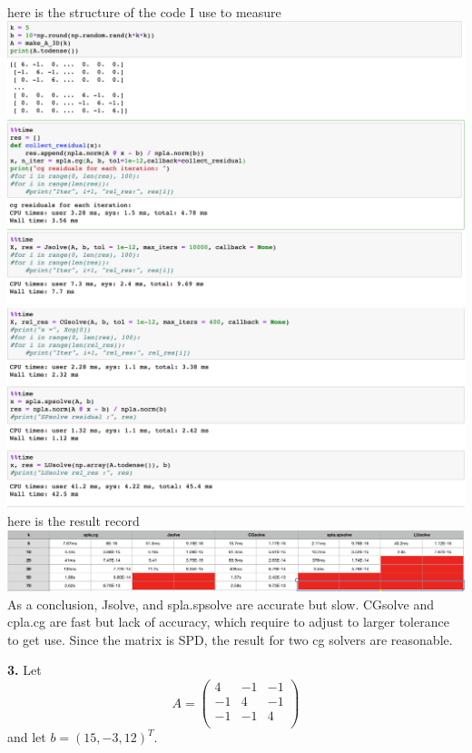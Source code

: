\documentclass[11pt]{article}
\begin{document}
\\here is the structure of the code I use to measure\\
\includegraphics[scale=0.4]{H421}\\
\includegraphics[scale=0.4]{H422.png}\\here is the result record\\
\includegraphics[scale=0.6]{H423.png}\\
As a conclusion, Jsolve, and spla.spsolve are accurate but slow. CGsolve and cpla.cg are fast but lack of accuracy, which require to adjust to larger tolerance to get use. Since the matrix is SPD, the result for two cg solvers are reasonable.


\par\newpage
{\bf 3.} 
Let
$$A =
   \left(
   \begin{array}{ccc}
    4 & -1 & -1 \\ 	
   -1 &  4 & -1 \\ 
   -1 & -1 &  4 \\
   \end{array} \right)
$$
and let $b = (15, -3, 12)^T$.
\end{document}
